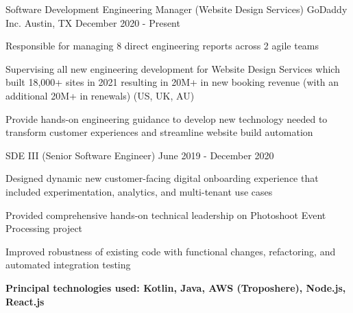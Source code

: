 

\begin{cventries}

  \cventry
    {Software Development Engineering Manager (Website Design Services)} %
    {GoDaddy Inc.} %
    {Austin, TX} %
    {December 2020 - Present} %
    {
      \begin{cvitems} %
        \item {Responsible for managing 8 direct engineering reports across 2 agile teams}
        \item {Supervising all new engineering development for Website Design Services which built 18,000+ sites in 2021 resulting in 20M+ in new booking revenue (with an additional 20M+ in renewals) (US, UK, AU)}
        \item {Provide hands-on engineering guidance to develop new technology needed to transform customer experiences and
streamline website build automation}
      \end{cvitems}
    }

  \cventry
    {SDE III (Senior Software Engineer)} %
    {} %
    {} %
    {June 2019 - December 2020} %
    {
      \begin{cvitems} %
              \item {Designed dynamic new customer-facing digital onboarding experience that included experimentation, analytics, and multi-tenant use cases}
        \item {Provided comprehensive hands-on technical leadership on Photoshoot Event Processing project}
        \item {Improved robustness of existing code with functional changes, refactoring, and automated integration testing}
        \item {\textbf{Principal technologies used: Kotlin, Java, AWS (Troposhere), Node.js, React.js}}
      \end{cvitems}
    }


\end{cventries}
